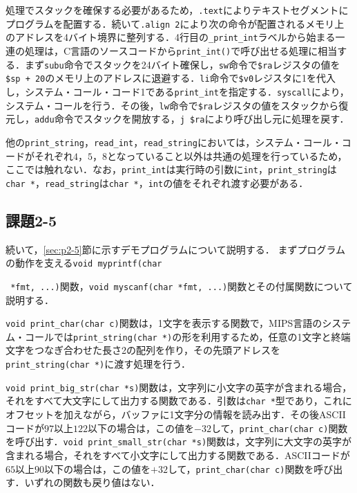 処理でスタックを確保する必要があるため，\verb|.text|によりテキストセグメントにプログラムを配置する．続いて\verb|.align 2|により次の命令が配置されるメモリ上のアドレスを4バイト境界に整列する．4行目の\verb|_print_int|ラベルから始まる一連の処理は，C言語のソースコードから\verb|print_int()|で呼び出せる処理に相当する．まず\verb|subu|命令でスタックを24バイト確保し，\verb|sw|命令で\verb|$ra|レジスタの値を\verb|$sp + 20|のメモリ上のアドレスに退避する．\verb|li|命令で\verb|$v0|レジスタに1を代入し，システム・コール・コード1である\verb|print_int|を指定する．\verb|syscall|により，システム・コールを行う．その後，\verb|lw|命令で\verb|$ra|レジスタの値をスタックから復元し，\verb|addu|命令でスタックを開放する，\verb|j $ra|により呼び出し元に処理を戻す．

他の\verb|print_string|，\verb|read_int|，\verb|read_string|においては，システム・コール・コードがそれぞれ$4$，$5$，$8$となっていること以外は共通の処理を行っているため，ここでは触れない．なお，\verb|print_int|は実行時の引数に\verb|int|，\verb|print_string|は\verb|char *|，\verb|read_string|は\verb|char *|，\verb|int|の値をそれぞれ渡す必要がある．



\subsection{課題2-5}
続いて，\ref{sec:p2-5}節に示すデモプログラムについて説明する．
まずプログラムの動作を支える\verb|void myprintf(char|

\noindent\verb| *fmt, ...)|関数，\verb|void myscanf(char *fmt, ...)|関数とその付属関数について説明する．

\verb|void print_char(char c)|関数は，1文字を表示する関数で，MIPS言語のシステム・コールでは\verb|print_string(char *)|の形を利用するため，任意の1文字と終端文字をつなぎ合わせた長さ2の配列を作り，その先頭アドレスを\verb|print_string(char *)|に渡す処理を行う．

\verb|void print_big_str(char *s)|関数は，文字列に小文字の英字が含まれる場合，それをすべて大文字にして出力する関数である．引数は\verb|char *|型であり，これにオフセットを加えながら，バッファに1文字分の情報を読み出す．その後ASCIIコードが$97$以上$122$以下の場合は，この値を$-32$して，\verb|print_char(char c)|関数を呼び出す．\verb|void print_small_str(char *s)|関数は，文字列に大文字の英字が含まれる場合，それをすべて小文字にして出力する関数である．ASCIIコードが$65$以上$90$以下の場合は，この値を$+32$して，\verb|print_char(char c)|関数を呼び出す．いずれの関数も戻り値はない．

